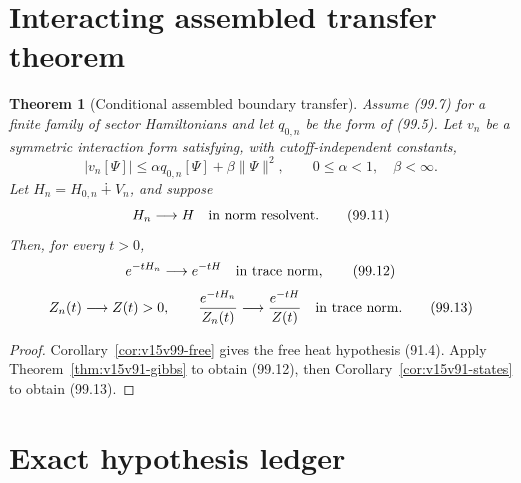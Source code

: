 \documentclass[11pt]{article}
\newtheorem{theorem}{Theorem}[section]
\theoremstyle{remark}
\begin{document}
\section{Interacting assembled transfer theorem}

\begin{theorem}[Conditional assembled boundary transfer]
\label{thm:v15v99-assembled}
Assume (99.7) for a finite family of sector Hamiltonians and let
\(q_{0,n}\) be the form of (99.5).  Let \(v_n\) be a symmetric
interaction form satisfying, with cutoff-independent constants,
\[
 |v_n[\Psi]|
 \leq\alpha q_{0,n}[\Psi]+\beta\|\Psi\|^2,
 \qquad 0\leq\alpha<1,\quad\beta<\infty.               \tag{99.10}
\]
Let \(H_n=H_{0,n}\dotplus V_n\), and suppose
\[
 H_n\longrightarrow H
 \quad\hbox{in norm resolvent}.                        \tag{99.11}
\]
Then, for every \(t>0\),
\[
 e^{-tH_n}\longrightarrow e^{-tH}
 \quad\hbox{in trace norm},                            \tag{99.12}
\]
\[
 Z_n(t)\longrightarrow Z(t)>0,\qquad
 {e^{-tH_n}\over Z_n(t)}
 \longrightarrow {e^{-tH}\over Z(t)}
 \quad\hbox{in trace norm}.                            \tag{99.13}
\]
\end{theorem}

\begin{proof}
Corollary~\ref{cor:v15v99-free} gives the free heat hypothesis
(91.4).  Apply Theorem~\ref{thm:v15v91-gibbs} to obtain (99.12),
then Corollary~\ref{cor:v15v91-states} to obtain (99.13).
\end{proof}

\section{Exact hypothesis ledger}
\end{document}
